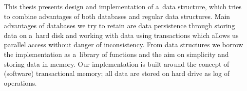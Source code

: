 This thesis presents design and implementation of a~data structure, which tries
to combine advantages of both databases and regular data structures.
Main advantages of databases we try to retain are data persistence
through storing data on a~hard disk and working with data using
transactions which allows us parallel access
without danger of inconsistency. From data structures
we borrow the implementation as a~library of functions and the aim on simplicity
and storing data in memory.
Our implementation is built around the concept of (software) transactional
memory; all data are stored on hard drive as log of operations.

